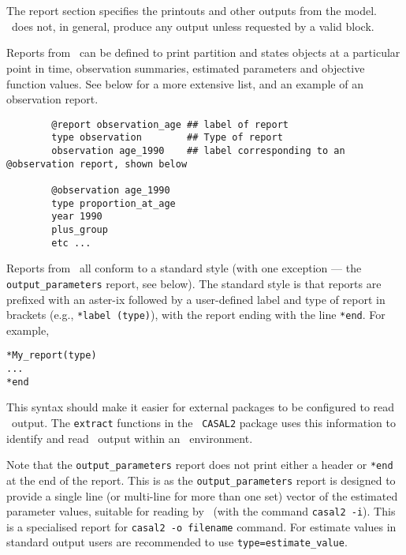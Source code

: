 \section{\label{{sec:report-section}}}
The report section specifies the printouts and other outputs from the model. \CNAME\ does not, in general, produce any output unless requested by a valid  block. 

Reports from \CNAME\ can be defined to print partition and states objects at a particular point in time, observation summaries, estimated parameters and objective function values. See below for a more extensive list, and an example of an observation report.

{\small{\begin{verbatim}
		@report observation_age ## label of report
		type observation		## Type of report
		observation age_1990	## label corresponding to an @observation report, shown below
		
		@observation age_1990
		type proportion_at_age
		year 1990
		plus_group
		etc ...
		\end{verbatim}}}

Reports from \CNAME\ all conform to a standard style (with one exception --- the \texttt{output\_parameters} report, see below). The standard style is that reports are prefixed with an aster-ix followed by a user-defined label and type of report in brackets (e.g., \texttt{*label (type)}), with the report ending with the line \texttt{*end}. For example,

\begin{verbatim} 
*My_report(type)
...
*end
\end{verbatim}


This syntax should make it easier for external packages to be configured to read \CNAME\ output. The \texttt{extract} functions in the \R\ \texttt{CASAL2} package uses this information to identify and read \CNAME\ output within an \R\ environment.

Note that the \texttt{output\_parameters} report does not print either a header or \texttt{*end} at the end of the report. This is as the \texttt{output\_parameters} report is designed to provide a single line (or multi-line for more than one set) vector of the estimated parameter values, suitable for reading by \CNAME\ (with the command \texttt{casal2 -i}). This is a specialised report for \texttt{casal2 -o filename} command. For estimate values in standard output users are recommended to use \texttt{type=estimate\_value}.

